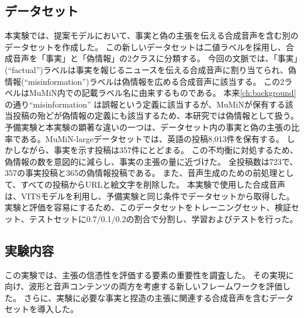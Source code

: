 \subsection{データセット}
本実験では、提案モデルにおいて、事実と偽の主張を伝える合成音声を含む別のデータセットを作成した。
この新しいデータセットは二値ラベルを採用し、合成音声を「事実」と「偽情報」の2クラスに分類する。
今回の文脈では、「事実」(``factual'')ラベルは事実を報じるニュースを伝える合成音声に割り当てられ、偽情報(``misinformation'')ラベルは偽情報を広める合成音声に該当する。
この2ラベルはMuMiN内での記載ラベル名に由来するものである。
本来\cref{ch:background}の通り``misinformation'' は誤報という定義に該当するが、MuMiNが保有する該当投稿の殆どが偽情報の定義にも該当するため、本研究では偽情報として扱う。
予備実験と本実験の顕著な違いの一つは、データセット内の事実と偽の主張の比率である。MuMiN-largeデータセットでは、英語の投稿8,013件を保有する。
しかしながら、事実を示す投稿は357件にとどまる。
この不均衡に対処するため、偽情報の数を意図的に減らし、事実の主張の量に近づけた。
全投稿数は723で、357の事実投稿と365の偽情報投稿である。
また、音声生成のための前処理として、すべての投稿からURLと絵文字を削除した。
本実験で使用した合成音声は、VITSモデルを利用し、予備実験と同じ条件でデータセットから取得した。
実験と評価を容易にするため、このデータセットをトレーニングセット、検証セット、テストセットに0.7/0.1/0.2の割合で分割し、学習およびテストを行った。

\subsection{実験内容}
この実験では、主張の信憑性を評価する要素の重要性を調査した。
その実現に向け、波形と音声コンテンツの両方を考慮する新しいフレームワークを評価した。
さらに、実験に必要な事実と捏造の主張に関連する合成音声を含むデータセットを導入した。

